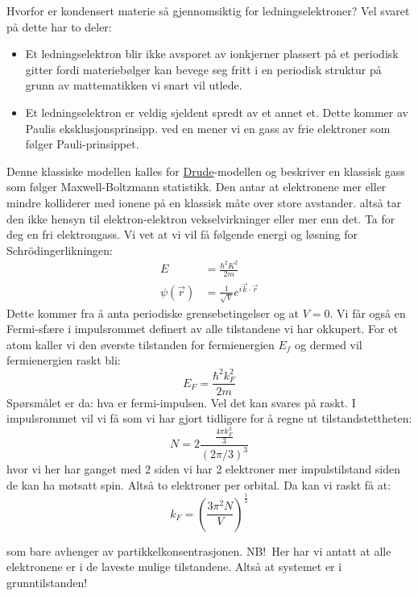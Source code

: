 \documentclass{article}
\begin{document}
Hvorfor er kondensert materie så gjennomsiktig for ledningselektroner? Vel svaret på dette har to deler:
\begin{itemize}
    \item Et ledningselektron blir ikke avsporet av ionkjerner plassert på et periodisk gitter fordi materiebølger kan bevege seg fritt i en periodisk struktur på grunn av mattematikken vi snart vil utlede.
    \item Et ledningselektron er veldig sjeldent spredt av et annet et. Dette kommer av Paulis eksklusjonsprinsipp. ved en  mener vi en gass av frie elektroner som følger Pauli-prinsippet.
\end{itemize}
Denne klassiske modellen kalles for \underline{Drude}-modellen og beskriver en klassisk gass som følger Maxwell-Boltzmann statistikk. Den antar at elektronene mer eller mindre kolliderer med ionene på en klassisk måte over store avstander. altså tar den ikke hensyn til elektron-elektron vekselvirkninger eller mer enn det.
 Ta for deg en fri elektrongass. Vi vet at vi vil få følgende energi og løsning for Schrödingerlikningen:
 \begin{align}
     E &= \frac{\hbar^2 K^2}{2m} \\
     \psi(\vec{r}) &= \frac{1}{\sqrt{V}} e^{i \vec{k} \cdot \vec{r}}
 \end{align}
 Dette kommer fra å anta periodiske grensebetingelser og at $V = 0$. Vi får også en Fermi-sfære i impulsrommet definert av alle tilstandene vi har okkupert. For et atom kaller vi den øverste tilstanden for fermienergien $E_f$ og dermed vil fermienergien raskt bli:
 \begin{equation}
     E_F = \frac{\hbar^2 k_F^2}{2m}
 \end{equation}
 Spørsmålet er da: hva er fermi-impulsen. Vel det kan svares på raskt. I impulsrommet vil vi få som vi har gjort tidligere for å regne ut tilstandstettheten:
 \begin{equation}
     N = 2 \frac{\frac{4 \pi k_F^3}{3}}{(2 \pi / 3)^3}
 \end{equation}
 hvor vi her har ganget med 2 siden vi har 2 elektroner mer impulstilstand siden de kan ha motsatt spin. Altså to elektroner per orbital. Da kan vi raskt få at:
 \begin{equation}
     k_F = \left(\frac{3 \pi^2 N}{V}\right)^{\frac{1}{3}}
 \end{equation}

 
 som bare avhenger av partikkelkonsentrasjonen. NB!\ Her har vi antatt at alle elektronene er i de laveste mulige tilstandene. Altså at systemet er i grunntilstanden!
\end{document}
